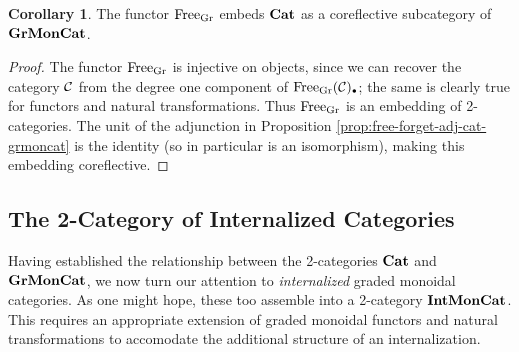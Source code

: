 \documentclass[openany, amssymb, psamsfonts]{amsart}
\theoremstyle{definition}
\newtheorem{cor}{Corollary}[section]
\numberwithin{equation}{section}
\begin{document}
\begin{cor}\label{cor:gr-coreflective-cat}
    The functor $\mathrm{Free}_{\mathrm{Gr}}$ embeds $\textbf{\textup{Cat}}$ as a coreflective subcategory of $\textbf{\textup{GrMonCat}}$.
\end{cor}
\begin{proof}
    The functor $\mathrm{Free}_{\mathrm{Gr}}$ is injective on objects, since we can recover the category $\mathcal{C}$ from the degree one component of $\Free_\Gr(\C)_\sbull$; the same is clearly true for functors and natural transformations. Thus $\mathrm{Free}_{\mathrm{Gr}}$ is an embedding of 2-categories. The unit of the adjunction in Proposition \ref{prop:free-forget-adj-cat-grmoncat} is the identity (so in particular is an isomorphism), making this embedding coreflective.
\end{proof}

\subsection{The 2-Category of Internalized Categories}

Having established the relationship between the 2-categories $\textbf{\textup{Cat}}$ and $\textbf{\textup{GrMonCat}}$, we now turn our attention to \emph{internalized} graded monoidal categories. As one might hope, these too assemble into a 2-category $\textbf{\textup{IntMonCat}}$. This requires an appropriate extension of graded monoidal functors and natural transformations to accomodate the additional structure of an internalization.
\end{document}
